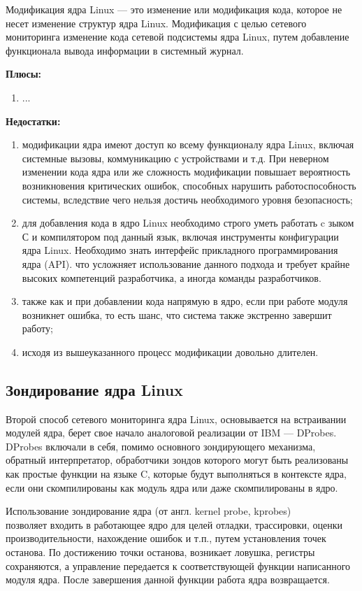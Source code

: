 Модификация ядра Linux --- это изменение или модификация кода, которое не несет изменение структур ядра Linux. Модификация с целью сетевого мониторинга \cite{linux_network_implementation} изменение кода сетевой подсистемы ядра Linux, путем добавление функционала вывода информации в системный журнал.

\textbf{Плюсы:}
\begin{enumerate}
	\item ...
\end{enumerate}

\textbf{Недостатки:}
\begin{enumerate}
	\item модификации ядра имеют доступ ко всему функционалу ядра Linux, включая системные вызовы, коммуникацию с устройствами и т.д. При неверном изменении кода ядра или же сложность модификации повышает вероятность возникновения критических ошибок, способных нарушить работоспособность системы, вследствие чего нельзя достичь необходимого уровня безопасность;
	\item для добавления кода в ядро Linux необходимо строго уметь работать c зыком С и компилятором под данный язык, включая инструменты конфигурации ядра Linux. Необходимо знать интерфейс прикладного программирования ядра (API)\cite{api_kernel}. что усложняет использование данного подхода и требует крайне высоких компетенций разработчика, а иногда команды разработчиков.
	\item также как и при добавлении кода напрямую в ядро, если при работе модуля возникнет ошибка, то есть шанс, что система также экстренно завершит
	работу;
	\item исходя из вышеуказанного процесс модификации довольно длителен.
\end{enumerate}

\subsection{Зондирование ядра Linux}
Второй способ сетевого мониторинга ядра Linux, основывается на встраивании модулей ядра, берет свое начало аналоговой реализации от IBM --- DProbes. DProbes включали в себя, помимо основного зондирующего механизма, обратный интерпретатор, обработчики зондов которого могут быть реализованы как простые функции на языке C, которые будут выполняться в контексте ядра, если они скомпилированы как модуль ядра или даже скомпилированы в ядро.

Использование зондирование ядра (от англ. kernel probe, kprobes) \\ \cite{kernel_probes,kernel_probes_ibm} позволяет входить в работающее ядро для целей отладки, трассировки, оценки производительности, нахождение ошибок и т.п., путем установления точек останова. 
По достижению точки останова, возникает ловушка, регистры сохраняются, а управление передается к соответствующей функции написанного модуля ядра.
После завершения данной функции работа ядра возвращается.  


